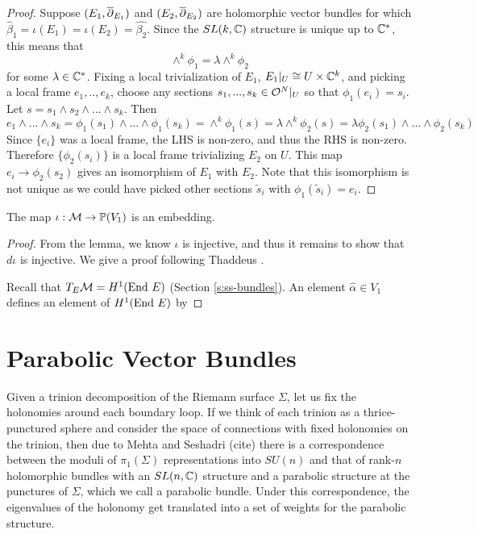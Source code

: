 	\begin{proof}
		 Suppose $(E_1, \overline{\partial}_{E_1})$ and $(E_2, \overline{\partial}_{E_2})$ are holomorphic vector bundles for which $\hat{\beta}_1 = \iota(E_1) = \iota(E_2) = \hat{\beta_2}$. Since the $SL(k,\mathbb{C})$ structure is unique up to $\mathbb{C}^\ast$, this means that
		\begin{equation}
		\wedge^k \phi_1 = \lambda \wedge^k \phi_2
		\end{equation}
		for some $\lambda \in \mathbb{C}^\ast$. Fixing a local trivialization of $E_1$, $E_1|_U \cong U\times \mathbb{C}^k$, and picking a local frame $e_1,..,e_k$, choose any sections $s_1,...,s_k \in \mathcal{O}^N|_{U}$ so that $\phi_1(e_i) = s_i$. Let $s = s_1 \wedge s_2 \wedge ... \wedge s_k$. Then
		\begin{equation}
		e_1\wedge...\wedge s_k=\phi_1(s_1)\wedge...\wedge \phi_1(s_k)= \wedge^k \phi_1(s) = \lambda \wedge^k \phi_2(s) = \lambda \phi_2(s_1)\wedge...\wedge \phi_2(s_k)
		\end{equation}
		Since $\{e_i\}$ was a local frame, the LHS is non-zero, and thus the RHS is non-zero. Therefore $\{\phi_2(s_i)\}$ is a local frame trivializing $E_2$ on $U$. This map $e_i \to \phi_2(s_2)$ gives an isomorphism of $E_1$ with $E_2$. Note that this isomorphism is not unique as we could have picked other sections $\tilde{s}_i$ with $\phi_1(\tilde{s}_i) = e_i$.
	\end{proof}
	\begin{theorem}
		\label{t:det-embed}
		The map $\iota:\mathcal{M} \to \mathbb{P}(V_1)$ is an embedding.
	\end{theorem}
	\begin{proof}
		From the lemma, we know $\iota$ is injective, and thus it remains to show that $d\iota$ is injective. We give a proof following Thaddeus \cite[Prop 7.1]{thaddeus_geometric_1996}.
		
		Recall that $T_{E}\mathcal{M} = H^1(\text{End } E)$ (Section \ref{s:ss-bundles}). An element $\hat{\alpha} \in V_1$ defines an element of $H^1(\text{End } E)$ by 
	\end{proof}

	\section{Parabolic Vector Bundles}
	Given a trinion decomposition of the Riemann surface $\Sigma$, let us fix the holonomies around each boundary loop. If we think of each trinion as a thrice-punctured sphere and consider the space of connections with fixed holonomies on the trinion, then due to Mehta and Seshadri (cite) there is a correspondence between the moduli of $\pi_1(\Sigma)$ representations into $SU(n)$ and that of rank-$n$ holomorphic bundles with an $SL(n,\mathbb{C})$ structure and a parabolic structure at the punctures of $\Sigma$, which we call a parabolic bundle. Under this correspondence, the eigenvalues of the holonomy get translated into a set of weights for the parabolic structure. 
	
